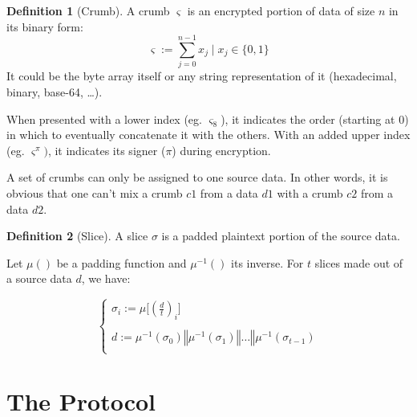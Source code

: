 \documentclass[twoside,twocolumn]{article}
\theoremstyle{definition}
\newtheorem{definition}{Definition}
\theoremstyle{remark}
\begin{document}
\begin{definition}[Crumb]
    \label{crumb}
    A crumb $\varsigma$ is an encrypted portion of data of size $n$ in its binary form:
    \begin{equation}
        \label{eq:crumb}
        \varsigma := \sum_{j=0}^{n-1} x_j \mid x_j \in \{ 0, 1 \}
    \end{equation}
    It could be the byte array itself or any string representation of it (hexadecimal, binary, base-64, \dots).

    When presented with a lower index (eg. $\varsigma_8$), it indicates the order (starting at $0$) in which to eventually concatenate it with the 
    others. With an added upper index (eg. $\varsigma^\pi)$, it indicates its signer ($\pi$) during encryption.

    A set of crumbs can only be assigned to one source data. In other words, it is obvious that one can't mix a crumb $c1$ from a data $d1$ with a 
    crumb $c2$ from a data $d2$.
\end{definition}

\begin{definition}[Slice]
    \label{slice}
    A slice $\sigma$ is a padded plaintext portion of the source data.

    Let $\mu()$ be a padding function and $\mu^{-1}()$ its inverse. For $t$ slices made out of a source data $d$, we have:
    \begin{small}
        \begin{equation}
            \label{eq:slice}
            \left\{
                \begin{array}{l}
                    \sigma_i := \mu \Big[ \left( \frac{d}{t} \right)_i \Big] \\ \\
                    d := \mu^{-1}(\sigma_0) \mathbin\Vert \mu^{-1}(\sigma_1) \mathbin\Vert \dots \mathbin\Vert \mu^{-1}(\sigma_{t-1}) \\
                \end{array}
            \right.
        \end{equation}
    \end{small}
\end{definition}


\section{The Protocol}
\end{document}
